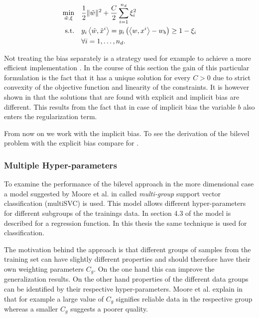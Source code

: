 \begin{equation}
\begin{split}
	\min_{\tilde{w},\xi} \quad & \frac{1}{2} \|\tilde{w}\|^2+\frac{C}{2}\sum_{i=1}^{n_d}{\xi_i^2} \vspace{0.5ex}\\
	\text{s.t.} \quad & y_i\Langle \tilde{w},\tilde{x}^i\Rangle = y_i\left(\Langle w,x^i\Rangle-w_b\right) \geq 1 - \xi_i \vspace{0.5ex}\\
	& 	\forall i = 1, \dots , n_d.
\label{SVM_bias}
\end{split}
\end{equation}

Not treating the bias separately is a strategy used for example to achieve a more efficient implementation \cite[section 3.2, p. 22]{Gunn1998}. In the course of this section the gain of this particular formulation is the fact that it has a unique solution for every \(C > 0\) due to strict convexity of the objective function and linearity of the constraints.
It is however shown in \cite[section 3.2, p. 22]{Gunn1998} that the solutions that are found with explicit and implicit bias are different.
This results from the fact that in case of implicit bias the variable \(b\) also enters the regularization term.

From now on we work with the implicit bias. To see the derivation of the bilevel problem with the explicit bias compare for \cite[section 2.2]{Kunapuli2008}.

\subsubsection{Multiple Hyper-parameters}

To examine the performance of the bilevel approach in the more dimensional case a model suggested by Moore et al. in \cite{Moore2011} called \emph{multi-group} support vector classification (multiSVC) is used. This model allows different hyper-parameters for different subgroups of the trainings data.
In section 4.3 of \cite{Moore2011} the model is described for a regression function. In this thesis the same technique is used for classification.

The motivation behind the approach is that different groups of samples from the training set can have slightly different properties and should therefore have their own weighting parameters \(C_g\).
On the one hand this can improve the generalization results. On the other hand properties of the different data groups can be identified by their respective hyper-parameters. Moore et al. explain in \cite[section 4.3, p. 9]{Moore2011} that for example a large value of \(C_g\) signifies reliable data in the respective group whereas a smaller \(C_g\) suggests a poorer quality.

